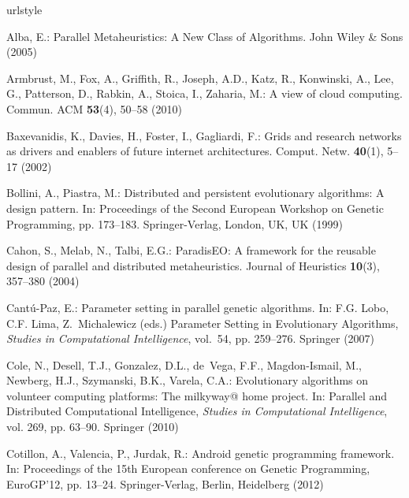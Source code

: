 \begin{thebibliography}{10}
\providecommand{\url}[1]{{#1}}
\providecommand{\urlprefix}{URL }
\expandafter\ifx\csname urlstyle\endcsname\relax
  \providecommand{\doi}[1]{DOI~\discretionary{}{}{}#1}\else
  \providecommand{\doi}{DOI~\discretionary{}{}{}\begingroup
  \urlstyle{rm}\Url}\fi

Alba, E.: Parallel Metaheuristics: {A} New Class of Algorithms.
\newblock John Wiley \& Sons (2005)

Armbrust, M., Fox, A., Griffith, R., Joseph, A.D., Katz, R., Konwinski, A.,
  Lee, G., Patterson, D., Rabkin, A., Stoica, I., Zaharia, M.: A view of cloud
  computing.
\newblock Commun. ACM \textbf{53}(4), 50--58 (2010)

Baxevanidis, K., Davies, H., Foster, I., Gagliardi, F.: Grids and research
  networks as drivers and enablers of future internet architectures.
\newblock Comput. Netw. \textbf{40}(1), 5--17 (2002)

Bollini, A., Piastra, M.: Distributed and persistent evolutionary algorithms: A
  design pattern.
\newblock In: Proceedings of the Second European Workshop on Genetic
  Programming, pp. 173--183. Springer-Verlag, London, UK, UK (1999)

Cahon, S., Melab, N., Talbi, E.G.: {ParadisEO}: A framework for the reusable
  design of parallel and distributed metaheuristics.
\newblock Journal of Heuristics \textbf{10}(3), 357--380 (2004)

Cant\'u-Paz, E.: Parameter setting in parallel genetic algorithms.
\newblock In: F.G. Lobo, C.F. Lima, Z.~Michalewicz (eds.) Parameter Setting in
  Evolutionary Algorithms, \emph{Studies in Computational Intelligence},
  vol.~54, pp. 259--276. Springer (2007)

Cole, N., Desell, T.J., Gonzalez, D.L., de~Vega, F.F., Magdon-Ismail, M.,
  Newberg, H.J., Szymanski, B.K., Varela, C.A.: Evolutionary algorithms on
  volunteer computing platforms: The milkyway@ home project.
\newblock In: Parallel and Distributed Computational Intelligence,
  \emph{Studies in Computational Intelligence}, vol. 269, pp. 63--90. Springer
  (2010)

Cotillon, A., Valencia, P., Jurdak, R.: Android genetic programming framework.
\newblock In: Proceedings of the 15th European conference on Genetic
  Programming, EuroGP'12, pp. 13--24. Springer-Verlag, Berlin, Heidelberg
  (2012)


\end{thebibliography}
